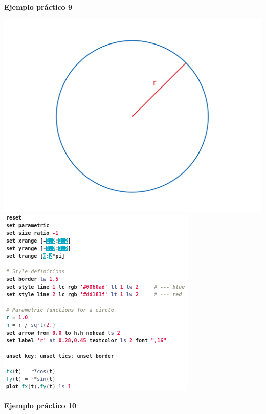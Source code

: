 \documentclass[11.5pt,a4paper]{article}
\begin{document}
\newpage
\textbf{Ejemplo práctico 9}

\includegraphics[scale=0.35]{ejemplo13.pdf}
\includegraphics[scale=0.45]{screen20.png}

\textbf{Ejemplo práctico 10}
\end{document}

